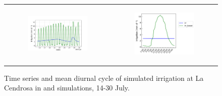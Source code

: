 \begin{figure}[hbtp]
    \centering
    \begin{tabular}{cc}
        \begin{subfigure}[t]{0.5\textwidth}
            \caption{}
            \includegraphics[width=\textwidth]{images/chap5/SOP_TS_DC/time_series_cendrosa_irrigation.png}
        \end{subfigure} &
        \begin{subfigure}[t]{0.5\textwidth}
            \caption{}
            \includegraphics[width=\textwidth]{images/chap5/SOP_TS_DC/diurnal_cycle_cendrosa_irrigation.png}
        \end{subfigure}
    \end{tabular} 
    \caption{Time series and mean diurnal cycle  of simulated irrigation at La Cendrosa in \irr and \irrboost simulations, 14-30 July.}
    \label{fig:sop_irrigation_orchidee}
\end{figure}

